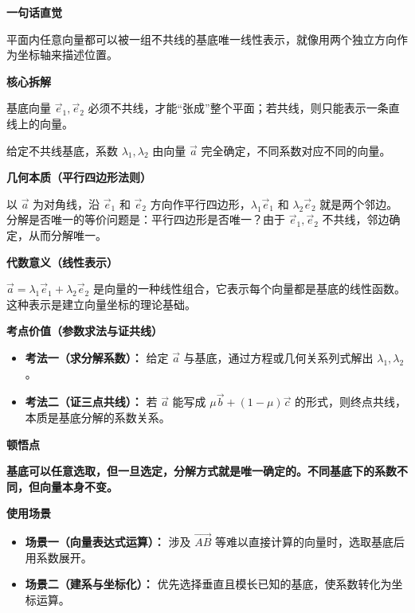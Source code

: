 \begin{explanationbox}
	\textbf{\textcolor{CExplanation}{一句话直觉}}
	\par 平面内任意向量都可以被一组不共线的基底唯一线性表示，就像用两个独立方向作为坐标轴来描述位置。

	\medskip
	\textbf{\textcolor{CExplanation}{核心拆解}}
	\begin{description}[style=nextline, leftmargin=2.8em, labelsep=0.5em, itemsep=0.45em]
		\item[\textbf{要点一（基底不共线）：}]
			基底向量 $\vec{e}_1,\vec{e}_2$ 必须不共线，才能“张成”整个平面；若共线，则只能表示一条直线上的向量。
		\item[\textbf{要点二（系数唯一性）：}]
			给定不共线基底，系数 $\lambda_1,\lambda_2$ 由向量 $\vec{a}$ 完全确定，不同系数对应不同的向量。
	\end{description}

	\medskip
	\textbf{\textcolor{CExplanation}{几何本质（平行四边形法则）}}
	\par 以 $\vec{a}$ 为对角线，沿 $\vec{e}_1$ 和 $\vec{e}_2$ 方向作平行四边形，$\lambda_1\vec{e}_1$ 和 $\lambda_2\vec{e}_2$ 就是两个邻边。分解是否唯一的等价问题是：平行四边形是否唯一？由于 $\vec{e}_1,\vec{e}_2$ 不共线，邻边确定，从而分解唯一。

	\medskip
	\textbf{\textcolor{CExplanation}{代数意义（线性表示）}}
	\par $\vec{a} = \lambda_1\vec{e}_1 + \lambda_2\vec{e}_2$ 是向量的一种线性组合，它表示每个向量都是基底的线性函数。这种表示是建立向量坐标的理论基础。

	\medskip
	\textbf{\textcolor{CExplanation}{考点价值（参数求法与证共线）}}
	\begin{itemize}[leftmargin=*, itemsep=0.5em, topsep=0.4em]
		\item \textbf{考法一（求分解系数）：} 给定 $\vec{a}$ 与基底，通过方程或几何关系列式解出 $\lambda_1,\lambda_2$。
		\item \textbf{考法二（证三点共线）：} 若 $\vec{a}$ 能写成 $\mu\vec{b} + (1-\mu)\vec{c}$ 的形式，则终点共线，本质是基底分解的系数关系。
	\end{itemize}

	\medskip
	\textbf{\textcolor{CExplanation}{顿悟点}}
	\par\textbf{基底可以任意选取，但一旦选定，分解方式就是唯一确定的。不同基底下的系数不同，但向量本身不变。}

	\medskip
	\textbf{\textcolor{CExplanation}{使用场景}}
	\begin{itemize}[leftmargin=*, itemsep=0.5em, topsep=0.4em]
		\item \textbf{场景一（向量表达式运算）：} 涉及 $\overrightarrow{AB}$ 等难以直接计算的向量时，选取基底后用系数展开。
		\item \textbf{场景二（建系与坐标化）：} 优先选择垂直且模长已知的基底，使系数转化为坐标运算。
	\end{itemize}

\end{explanationbox}
